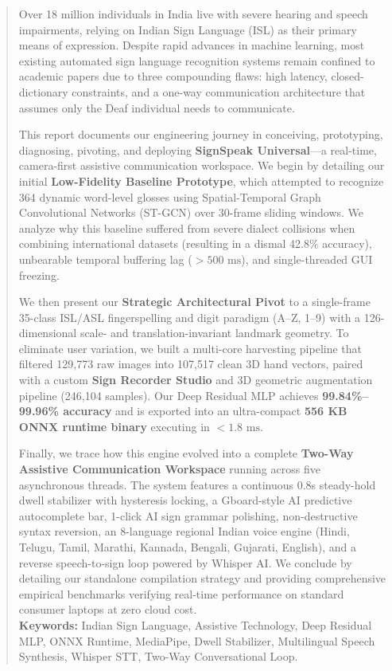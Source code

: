 \begin{abstract}
Over 18 million individuals in India live with severe hearing and speech impairments, relying on Indian Sign Language (ISL) as their primary means of expression. Despite rapid advances in machine learning, most existing automated sign language recognition systems remain confined to academic papers due to three compounding flaws: high latency, closed-dictionary constraints, and a one-way communication architecture that assumes only the Deaf individual needs to communicate.

This report documents our engineering journey in conceiving, prototyping, diagnosing, pivoting, and deploying \textbf{SignSpeak Universal}---a real-time, camera-first assistive communication workspace. We begin by detailing our initial \textbf{Low-Fidelity Baseline Prototype}, which attempted to recognize 364 dynamic word-level glosses using Spatial-Temporal Graph Convolutional Networks (ST-GCN) over 30-frame sliding windows. We analyze why this baseline suffered from severe dialect collisions when combining international datasets (resulting in a dismal 42.8\% accuracy), unbearable temporal buffering lag ($>500\text{ ms}$), and single-threaded GUI freezing.

We then present our \textbf{Strategic Architectural Pivot} to a single-frame 35-class ISL/ASL fingerspelling and digit paradigm (A--Z, 1--9) with a 126-dimensional scale- and translation-invariant landmark geometry. To eliminate user variation, we built a multi-core harvesting pipeline that filtered 129,773 raw images into 107,517 clean 3D hand vectors, paired with a custom \textbf{Sign Recorder Studio} and 3D geometric augmentation pipeline (246,104 samples). Our Deep Residual MLP achieves \textbf{99.84\%--99.96\% accuracy} and is exported into an ultra-compact \textbf{556 KB ONNX runtime binary} executing in \textbf{$<1.8\text{ ms}$}.

Finally, we trace how this engine evolved into a complete \textbf{Two-Way Assistive Communication Workspace} running across five asynchronous threads. The system features a continuous 0.8s steady-hold dwell stabilizer with hysteresis locking, a Gboard-style AI predictive autocomplete bar, 1-click AI sign grammar polishing, non-destructive syntax reversion, an 8-language regional Indian voice engine (Hindi, Telugu, Tamil, Marathi, Kannada, Bengali, Gujarati, English), and a reverse speech-to-sign loop powered by Whisper AI. We conclude by detailing our standalone compilation strategy and providing comprehensive empirical benchmarks verifying real-time performance on standard consumer laptops at zero cloud cost.\\[6pt]
\textbf{Keywords:} Indian Sign Language, Assistive Technology, Deep Residual MLP, ONNX Runtime, MediaPipe, Dwell Stabilizer, Multilingual Speech Synthesis, Whisper STT, Two-Way Conversational Loop.
\end{abstract}

